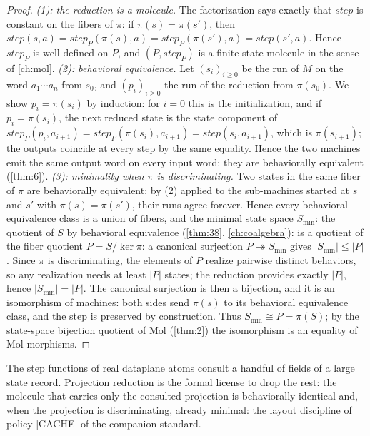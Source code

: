 \begin{proof}
\emph{(1): the reduction is a molecule.} The factorization says exactly that
$\mathit{step}$ is constant on the fibers of $\pi$: if $\pi (s) = \pi (s')$,
then $\mathit{step} (s, a) = \mathit{step}_{P} (\pi (s), a) =
\mathit{step}_{P} (\pi (s'), a) = \mathit{step} (s', a)$. Hence
$\mathit{step}_{P}$ is well-defined on $P$, and $(P, \mathit{step}_{P})$ is a
finite-state molecule in the sense of \autoref{ch:mol}.
\emph{(2): behavioral equivalence.} Let $(s_i)_{i \ge 0}$ be the run of $M$
on the word $a_1 \cdots a_n$ from $s_0$, and $(p_i)_{i \ge 0}$ the run of the
reduction from $\pi (s_0)$. We show $p_i = \pi (s_i)$ by induction: for $i = 0$
this is the initialization, and if $p_i = \pi (s_i)$, the next reduced state is
the state component of
$\mathit{step}_{P} (p_i, a_{i+1}) = \mathit{step}_{P} (\pi (s_i), a_{i+1}) =
\mathit{step} (s_i, a_{i+1})$, which is $\pi (s_{i+1})$; the outputs coincide at
every step by the same equality. Hence the two machines emit the same output
word on every input word: they are behaviorally equivalent (\autoref{thm:6}).
\emph{(3): minimality when $\pi$ is discriminating.} Two states in the same
fiber of $\pi$ are behaviorally equivalent: by (2) applied to the sub-machines
started at $s$ and $s'$ with $\pi (s) = \pi (s')$, their runs agree forever.
Hence every behavioral equivalence class is a union of fibers, and the minimal
state space $S_{\min}$: the quotient of $S$ by behavioral equivalence
(\autoref{thm:38}, \autoref{ch:coalgebra}): is a quotient of the fiber quotient
$P = S / \ker \pi$: a canonical surjection $P \twoheadrightarrow S_{\min}$
gives $|S_{\min}| \le |P|$. Since $\pi$ is discriminating, the elements of
$P$ realize pairwise distinct behaviors, so any realization needs at least
$|P|$ states; the reduction provides exactly $|P|$, hence $|S_{\min}| =
|P|$. The canonical surjection is then a bijection, and it is an isomorphism
of machines: both sides send $\pi (s)$ to its behavioral equivalence class, and
the step is preserved by construction. Thus $S_{\min} \cong P = \pi (S)$; by
the state-space bijection quotient of Mol (\autoref{thm:2}) the isomorphism is an equality
of Mol-morphisms.
\end{proof}

\begin{remark}
The step functions of real dataplane atoms consult a handful of fields of a
large state record. Projection reduction is the formal license to drop the
rest: the molecule that carries only the consulted projection is
behaviorally identical and, when the projection is discriminating, already
minimal: the layout discipline of policy [CACHE] of the companion standard.
\end{remark}

